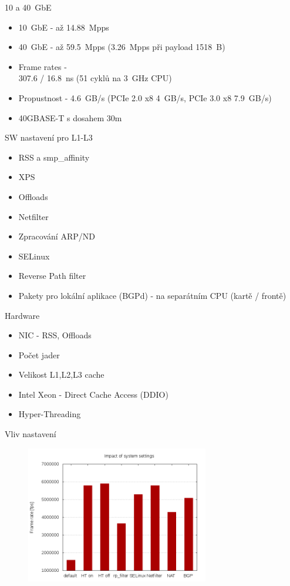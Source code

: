 \documentclass{beamer}
\begin{document}
\begin{frame}{10 a 40~GbE}
	\begin{itemize}
		\item 10~GbE - až 14.88~Mpps
		\item 40~GbE - až 59.5~Mpps (3.26~Mpps při payload 1518~B)
		\item Frame rates -  \\
		307.6 / 16.8~ns (51 cyklů na 3~GHz CPU)
		\item Propustnost - 4.6~GB/s (PCIe 2.0 x8 4~GB/s, PCIe 3.0 x8 7.9~GB/s)
		\item 40GBASE-T s dosahem 30m
	\end{itemize}
\end{frame}

\begin{frame}{SW nastavení pro L1-L3}
	\begin{itemize}
		\item RSS a smp\_affinity
		\item XPS
		\item Offloads
		\item Netfilter
		\item Zpracování ARP/ND
		\item SELinux
		\item Reverse Path filter
		\item Pakety pro lokální aplikace (BGPd) - na separátním CPU (kartě / frontě)
	\end{itemize}
\end{frame}

\begin{frame}{Hardware}
	\begin{itemize}
		\item NIC - RSS, Offloads
		\item Počet jader
		\item Velikost L1,L2,L3 cache
		\item Intel Xeon - Direct Cache Access (DDIO)
		\item Hyper-Threading
	\end{itemize}
\end{frame}

\begin{frame}{Vliv nastavení}
	\begin{figure}
		\centering
		\includegraphics[width=8cm,keepaspectratio]{fig/settings.png}
	\end{figure}
\end{frame}
\end{document}
